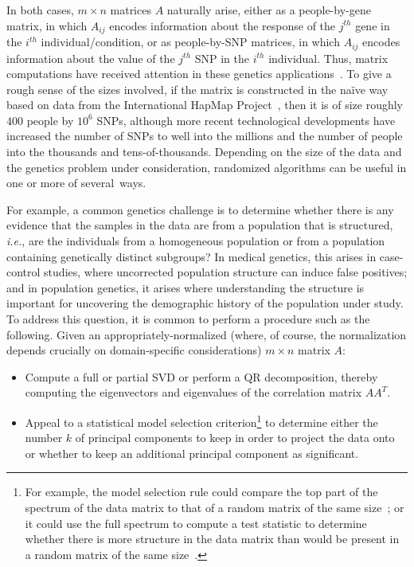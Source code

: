 \documentclass[twoside]{article}
\begin{document}
In both cases, $m \times n$ matrices $A$ naturally arise, either as a
people-by-gene matrix, in which $A_{ij}$ encodes information about the 
response of the $j^{th}$ gene in the $i^{th}$ individual/condition, or as 
people-by-SNP matrices, in which $A_{ij}$ encodes information about the 
value of the $j^{th}$ SNP in the $i^{th}$ individual.
Thus, matrix computations have received attention in these genetics
applications~\cite{Alter_SVD_00,KPS02,Meng03,Horne04,LA04,PPR06}.
To give a rough sense of the sizes involved, if the matrix is constructed in 
the na\"{i}ve way based on data from the International HapMap 
Project~\cite{IHMC03,IHMC05}, then it is of size roughly $400$ people by 
$10^{6}$ SNPs, although more recent technological developments have 
increased the number of SNPs to well into the millions and the number of people 
into the thousands and tens-of-thousands.
Depending on the size of the data and the genetics problem under 
consideration, randomized algorithms can be useful in one or more of 
several~ways.

For example, a common genetics challenge is to determine whether there is 
any evidence that the samples in the data are from a population that is 
structured, \emph{i.e.}, are the individuals from a homogeneous population 
or from a population containing genetically distinct subgroups?
In medical genetics, this arises in case-control studies, where uncorrected 
population structure can induce false positives; and in population genetics, 
it arises where understanding the structure is important for uncovering the
demographic history of the population under study.
To address this question, it is common to perform a procedure such as the 
following.
Given an appropriately-normalized (where, of course, the normalization depends crucially on domain-specific considerations) $m \times n$ matrix $A$:
\begin{itemize}
\item
Compute a full or partial SVD or perform a QR decomposition, thereby 
computing the eigenvectors and eigenvalues of the correlation matrix $AA^T$.
\item
Appeal to a statistical model selection criterion\footnote{For example, the model selection rule could compare the top part 
of the spectrum of the data matrix to that of a random matrix of the same 
size~\cite{Paschou07b,FK81}; 
or it could use the full spectrum to compute a test statistic to determine
whether there is more structure in the data matrix than would be present in 
a random matrix of the same size~\cite{PPR06,Joh01}.}
to determine either the number $k$ of principal components to keep in order 
to project the data onto or whether to keep an additional principal 
component as significant.
\end{itemize}
\end{document}
